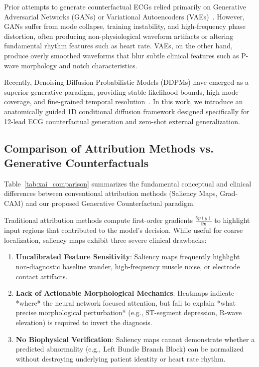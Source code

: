 \documentclass[5p,twocolumn,10pt]{elsarticle}
\begin{document}
Prior attempts to generate counterfactual ECGs relied primarily on Generative Adversarial Networks (GANs) or Variational Autoencoders (VAEs)~\cite{korkmaz2021deep, dempsey2022generative}. However, GANs suffer from mode collapse, training instability, and high-frequency phase distortion, often producing non-physiological waveform artifacts or altering fundamental rhythm features such as heart rate. VAEs, on the other hand, produce overly smoothed waveforms that blur subtle clinical features such as P-wave morphology and notch characteristics.

Recently, Denoising Diffusion Probabilistic Models (DDPMs) have emerged as a superior generative paradigm, providing stable likelihood bounds, high mode coverage, and fine-grained temporal resolution~\cite{ho2020denoising, dhariwal2021diffusion}. In this work, we introduce an anatomically guided 1D conditional diffusion framework designed specifically for 12-lead ECG counterfactual generation and zero-shot external generalization.

\subsection{Comparison of Attribution Methods vs. Generative Counterfactuals}
Table~\ref{tab:xai_comparison} summarizes the fundamental conceptual and clinical differences between conventional attribution methods (Saliency Maps, Grad-CAM) and our proposed Generative Counterfactual paradigm.

Traditional attribution methods compute first-order gradients $\frac{\partial p(y)}{\partial \mathbf{x}}$ to highlight input regions that contributed to the model's decision. While useful for coarse localization, saliency maps exhibit three severe clinical drawbacks:
\begin{enumerate}
    \item \textbf{Uncalibrated Feature Sensitivity}: Saliency maps frequently highlight non-diagnostic baseline wander, high-frequency muscle noise, or electrode contact artifacts.
    \item \textbf{Lack of Actionable Morphological Mechanics}: Heatmaps indicate *where* the neural network focused attention, but fail to explain *what precise morphological perturbation* (e.g., ST-segment depression, R-wave elevation) is required to invert the diagnosis.
    \item \textbf{No Biophysical Verification}: Saliency maps cannot demonstrate whether a predicted abnormality (e.g., Left Bundle Branch Block) can be normalized without destroying underlying patient identity or heart rate rhythm.
\end{enumerate}
\end{document}
